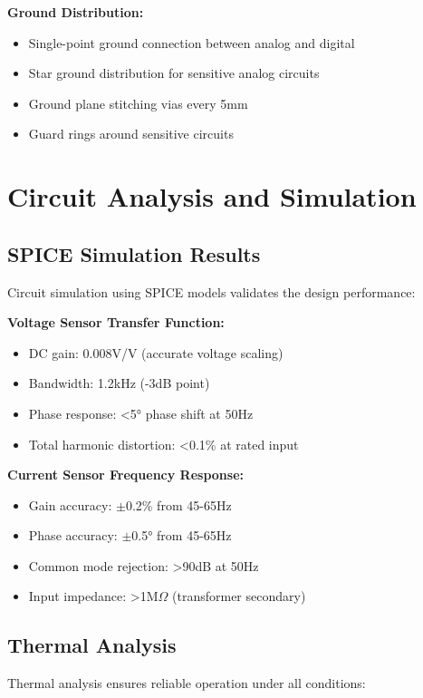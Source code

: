 \textbf{Ground Distribution:}
\begin{itemize}
\item Single-point ground connection between analog and digital
\item Star ground distribution for sensitive analog circuits
\item Ground plane stitching vias every 5mm
\item Guard rings around sensitive circuits
\end{itemize}

\section{Circuit Analysis and Simulation}
\label{sec:circuit_analysis}

\subsection{SPICE Simulation Results}
\label{subsec:spice_simulation}

Circuit simulation using SPICE models validates the design performance:

\textbf{Voltage Sensor Transfer Function:}
\begin{itemize}
\item DC gain: 0.008V/V (accurate voltage scaling)
\item Bandwidth: 1.2kHz (-3dB point)
\item Phase response: <5° phase shift at 50Hz
\item Total harmonic distortion: <0.1\% at rated input
\end{itemize}

\textbf{Current Sensor Frequency Response:}
\begin{itemize}
\item Gain accuracy: $\pm$0.2\% from 45-65Hz
\item Phase accuracy: $\pm$0.5° from 45-65Hz
\item Common mode rejection: >90dB at 50Hz
\item Input impedance: >1M$\Omega$ (transformer secondary)
\end{itemize}

\subsection{Thermal Analysis}
\label{subsec:thermal_analysis}

Thermal analysis ensures reliable operation under all conditions:


